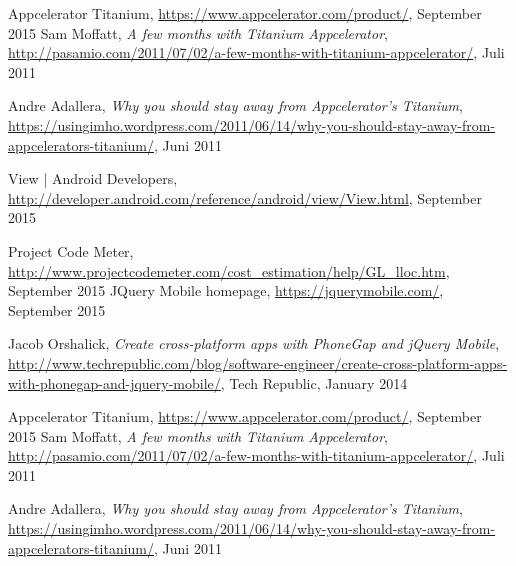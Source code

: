 \begin{thebibliography}{9}
	Appcelerator Titanium,
	\url{https://www.appcelerator.com/product/},
	September 2015
	Sam Moffatt,
	\emph{A few months with Titanium Appcelerator},
	\url{http://pasamio.com/2011/07/02/a-few-months-with-titanium-appcelerator/},
	Juli 2011

	Andre Adallera,
\emph{Why you should stay away from Appcelerator’s Titanium},
\url{https://usingimho.wordpress.com/2011/06/14/why-you-should-stay-away-from-appcelerators-titanium/},
	Juni 2011

	View | Android Developers,
	\url{http://developer.android.com/reference/android/view/View.html},
	September 2015	
	
	Project Code Meter, 
	\url{http://www.projectcodemeter.com/cost_estimation/help/GL_lloc.htm},
	September 2015
	JQuery Mobile homepage,
	\url{https://jquerymobile.com/},
	September 2015

Jacob Orshalick,
\emph{Create cross-platform apps with PhoneGap and jQuery Mobile},
\url{http://www.techrepublic.com/blog/software-engineer/create-cross-platform-apps-with-phonegap-and-jquery-mobile/},
	Tech Republic,
	January 2014

	Appcelerator Titanium,
	\url{https://www.appcelerator.com/product/},
	September 2015
	Sam Moffatt,
	\emph{A few months with Titanium Appcelerator},
	\url{http://pasamio.com/2011/07/02/a-few-months-with-titanium-appcelerator/},
	Juli 2011

	Andre Adallera,
\emph{Why you should stay away from Appcelerator’s Titanium},
\url{https://usingimho.wordpress.com/2011/06/14/why-you-should-stay-away-from-appcelerators-titanium/},
	Juni 2011
	
\end{thebibliography}